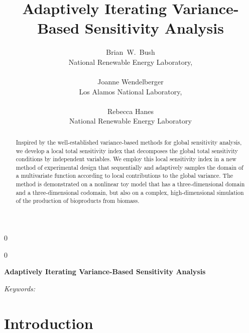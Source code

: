 \documentclass[12pt]{article}
\newcommand{\blind}{0}
\begin{document}
%

\def\spacingset#1{\renewcommand{\baselinestretch}%
{#1}\small\normalsize} \spacingset{1}



\blind
{
  \title{\bf Adaptively Iterating Variance-Based Sensitivity Analysis}
  \author{
    Brian\ W.\ Bush \\
    National Renewable Energy Laboratory, \\ \\
    Joanne Wendelberger \\
    Los Alamos National Laboratory, \\ \\
    Rebecca Hanes \\
    National Renewable Energy Laboratory
  }
  \maketitle
} \fi

\blind
{
  \bigskip
  \bigskip
  \bigskip
  \begin{center}
    {\LARGE\bf Adaptively Iterating Variance-Based Sensitivity Analysis}
\end{center}
  \medskip
} \fi

\bigskip
\begin{abstract}
Inspired by the well-established variance-based methods for global sensitivity analysis, we develop a local total sensitivity index that decomposes the global total sensitivity conditions by independent variables. We employ this local sensitivity index in a new method of experimental design that sequentially and adaptively samples the domain of a multivariate function according to local contributions to the global variance. The method is demonstrated on a nonlinear toy model that has a three-dimensional domain and a three-dimensional codomain, but also on a complex, high-dimensional simulation of the production of bioproducts from biomass. 
\end{abstract}

\noindent%
{\it Keywords:} 
\vfill

\newpage


\section{Introduction}
\end{document}

